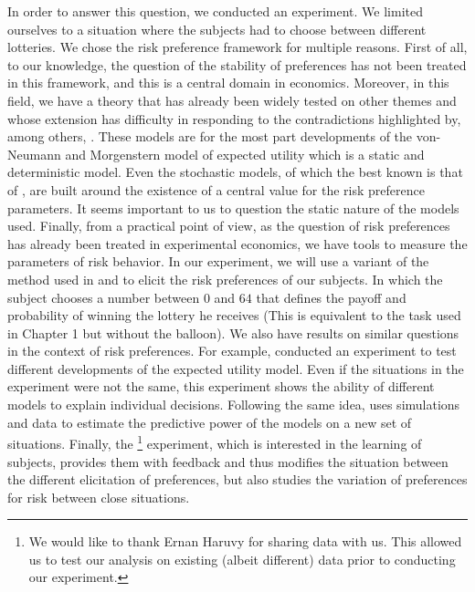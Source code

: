 \documentclass[
]{book}
\begin{document}
In order to answer this question, we conducted an experiment. We
limited ourselves to a situation where the subjects had to choose
between different lotteries. We chose the risk preference framework for
multiple reasons. First of all, to our knowledge, the question of the
stability of preferences has not been treated in this framework, and
this is a central domain in economics. Moreover, in this field, we have
a theory that has already been widely tested on other themes and whose
extension has difficulty in responding to the contradictions highlighted
by, among others, \citet{friedman2014risky}. These models are for the most part
developments of the von-Neumann and Morgenstern model of expected
utility which is a static and deterministic model. Even the stochastic
models, of which the best known is that of \citet{luce2012individual}, are
built around the existence of a central value for the risk preference
parameters. It seems important to us to question the static nature of
the models used. Finally, from a practical point of view, as the
question of risk preferences has already been treated in experimental
economics, we have tools to measure the parameters of risk behavior. In
our experiment, we will use a variant of the method used in
\citet{lejuez2002evaluation} and \citet{crosetto2013bomb} to elicit the risk
preferences of our subjects.
In which the subject chooses a number between \(0\) and \(64\) that defines the
payoff and probability of winning the lottery he receives (This is equivalent
to the task used in Chapter 1 but without the balloon).
We also have results on similar questions
in the context of risk preferences. For example, \citet{hey1994investigating}
conducted an experiment to test different developments of the expected
utility model. Even if the situations in the experiment were not the
same, this experiment shows the ability of different models to explain
individual decisions. Following the same idea, \citet{wilcox2007predicting}
uses simulations and \citet{hey1994investigating} data to estimate the
predictive power of the models on a new set of situations. Finally, the
\citet{ert2017revisiting}\footnote{We would like to thank Ernan Haruvy for sharing data with us. This allowed us to test our analysis on existing (albeit different) data prior to conducting our experiment.} experiment, which is interested in the learning
of subjects, provides them with feedback and thus modifies the situation
between the different elicitation of preferences, but also studies the
variation of preferences for risk between close situations.
\end{document}
